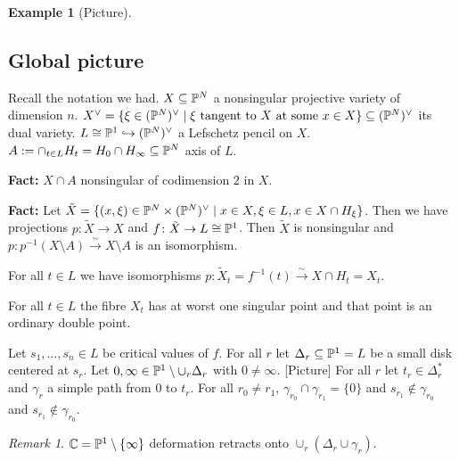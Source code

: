 \documentclass[A4paper, british]{amsart}
\theoremstyle{darkgreentheorem}
\theoremstyle{darkbluedefinition}
\theoremstyle{darkredexample}
\newtheorem{exa}[thm]{Example}
\theoremstyle{remark}
\newtheorem{rem}[thm]{Remark}
\newcommand{\1}{\mathbbm{1}}
\newcommand{\dual}{^{\vee}}
\newcommand{\tms}{\times}
\newcommand{\sub}{\subseteq}
\newcommand{\mono}{\hookrightarrow}
\begin{document}
\begin{exa}
    [Picture]
\end{exa}

\subsection{Global picture}

Recall the notation we had.
$X\sub \P^{N}$ a nonsingular projective variety of dimension $n$.
$X\dual=\{\xi\in (\P^{N})\dual\mid \xi \text{ tangent to }X\text{ at some }x\in X\}\sub(\P^{N})\dual$ its dual variety.
$L\cong \P^{1}\mono (\P^{N})\dual$ a Lefschetz pencil on $X$.
$A:=\cap_{t\in L}H_{t}=H_{0}\cap H_{\infty} \sub \P^{N}$ axis of $L$.

\textbf{Fact:}
$X\cap A$ nonsingular of codimension $2$ in $X$.

\textbf{Fact:}
Let $\tilde{X}=\{(x,\xi)\in \P^{N}\tms (\P^{N})\dual \mid x\in X, \xi\in L, x\in X\cap H_{\xi} \}$.
Then we have projections $p\colon \tilde{X}\to X$ and $f\colon \tilde{X}\to L\cong \P^{1}$.
Then $\tilde{X}$ is nonsingular and $p\colon p^{-1}(X\setminus A)\xrightarrow{\sim}X\setminus A$ is an isomorphism.

For all $t\in L$ we have isomorphisms $p\colon \tilde{X}_{t}=f^{-1}(t)\xrightarrow{\sim}X\cap H_{t}=X_{t}$.

For all $t\in L$ the fibre $X_{t}$ has at worst one singular point and that point is an ordinary double point.

Let $s_{1},\ldots,s_{n}\in L$ be critical values of $f$.
For all $r$ let $\Delta_{r}\sub \P^{1}=L$ be a small disk centered at $s_{r}$.
Let $0,\infty\in \P^{1}\setminus \cup_{r}\Delta_{r}$ with $0\neq \infty$.
[Picture]
For all $r$ let $t_{r}\in \Delta_{r}^{*}$ and $\gamma_{r}$ a simple path from $0$ to $t_{r}$.
For all $r_{0}\neq r_{1}$, $\gamma_{r_{0}}\cap \gamma_{r_{1}}=\{0\}$ and $s_{r_{1}}\not\in\gamma_{r_{0}}$ and $s_{r_{1}}\not\in \gamma_{r_{0}}$.

\begin{rem}
    $\C=\P^{1}\setminus \{\infty\}$ deformation retracts onto $\cup_{r}(\Delta_{r}\cup \gamma_{r})$.
\end{rem}
\end{document}
